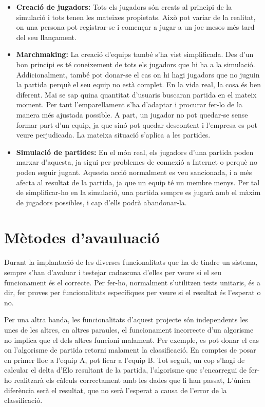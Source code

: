 \documentclass[a4paper]{article}
\begin{document}
\begin{itemize}
    \item \textbf{Creació de jugadors:} Tots els jugadors són creats al principi de la simulació i tots tenen les mateixes propietats. Això pot variar de la realitat, on una persona pot registrar-se i començar a jugar a un joc mesos més tard del seu llançament. 
    
    \item \textbf{Marchmaking:} La creació d'equips també s'ha vist simplificada. Des d'un bon principi es té coneixement de tots els jugadors que hi ha a la simulació. Addicionalment, també pot donar-se el cas on hi hagi jugadors que no juguin la partida perquè el seu equip no està complet. En la vida real, la cosa és ben diferent. Mai se sap quina quantitat d'usuaris buscaran partida en el mateix moment. Per tant l'emparellament s'ha d'adaptar i procurar fer-lo de la manera més ajustada possible. A part, un jugador no pot quedar-se sense formar part d'un equip, ja que sinó pot quedar descontent i l'empresa es pot veure perjudicada. La mateixa situació s'aplica a les partides.
    
    \item \textbf{Simulació de partides:} En el món real, els jugadors d'una partida poden marxar d'aquesta, ja sigui per problemes de connexió a Internet o perquè no poden seguir jugant. Aquesta acció normalment es veu sancionada, i a més afecta al resultat de la partida, ja que un equip té un membre menys. Per tal de simplificar-ho en la simulació, una partida sempre es jugarà amb el màxim de jugadors possibles, i cap d'ells podrà abandonar-la.
    
\end{itemize}

\newpage

\section{Mètodes d'avauluació}

Durant la implantació de les diverses funcionalitats que ha de tindre un sistema, sempre s'han d'avaluar i testejar cadascuna d'elles per veure si el seu funcionament és el correcte. Per fer-ho, normalment s'utilitzen tests unitaris, és a dir, fer proves per funcionalitats específiques per veure si el resultat és l'esperat o no.

Per una altra banda, les funcionalitats d'aquest projecte són independents les unes de les altres, en altres paraules, el funcionament incorrecte d'un algorisme no implica que el dels altres funcioni malament. Per exemple, es pot donar el cas on l'algorisme de partida retorni malament la classificació. En comptes de posar en primer lloc a l'equip A, pot ficar a l'equip B. Tot seguit, un cop s'hagi de calcular el delta d'Elo resultant de la partida, l'algorisme que s'encarregui de fer-ho realitzarà els càlculs correctament amb les dades que li han passat, L'única diferència serà el resultat, que no serà l'esperat a causa de l'error de la classificació.
\end{document}

